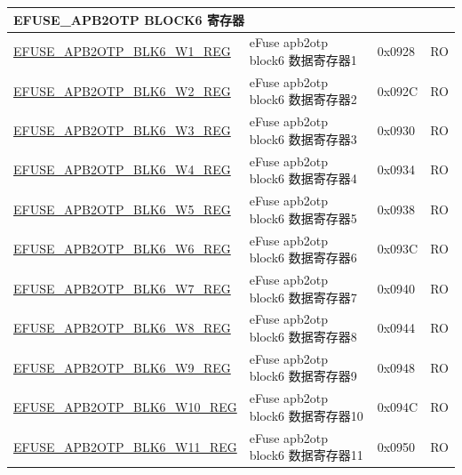 \begin{longtable}{ | p{7cm} | p{6cm} | p{1.2cm} | p{1.5cm} | }
\multicolumn{4}{|l|}{\textbf{EFUSE\_APB2OTP BLOCK6 寄存器}} \\ \hline
\hyperref[regdesc:EFUSEAPB2OTPBLK6WNREG]{EFUSE\_APB2OTP\_BLK6\_W1\_REG} & eFuse apb2otp block6 数据寄存器1 & 0x0928 & RO \\\hline
\hyperref[regdesc:EFUSEAPB2OTPBLK6WNREG]{EFUSE\_APB2OTP\_BLK6\_W2\_REG} & eFuse apb2otp block6 数据寄存器2 & 0x092C & RO \\\hline
\hyperref[regdesc:EFUSEAPB2OTPBLK6WNREG]{EFUSE\_APB2OTP\_BLK6\_W3\_REG} & eFuse apb2otp block6 数据寄存器3 & 0x0930 & RO \\\hline
\hyperref[regdesc:EFUSEAPB2OTPBLK6WNREG]{EFUSE\_APB2OTP\_BLK6\_W4\_REG} & eFuse apb2otp block6 数据寄存器4 & 0x0934 & RO \\\hline
\hyperref[regdesc:EFUSEAPB2OTPBLK6WNREG]{EFUSE\_APB2OTP\_BLK6\_W5\_REG} & eFuse apb2otp block6 数据寄存器5 & 0x0938 & RO \\\hline
\hyperref[regdesc:EFUSEAPB2OTPBLK6WNREG]{EFUSE\_APB2OTP\_BLK6\_W6\_REG} & eFuse apb2otp block6 数据寄存器6 & 0x093C & RO \\\hline
\hyperref[regdesc:EFUSEAPB2OTPBLK6WNREG]{EFUSE\_APB2OTP\_BLK6\_W7\_REG} & eFuse apb2otp block6 数据寄存器7 & 0x0940 & RO \\\hline
\hyperref[regdesc:EFUSEAPB2OTPBLK6WNREG]{EFUSE\_APB2OTP\_BLK6\_W8\_REG} & eFuse apb2otp block6 数据寄存器8 & 0x0944 & RO \\\hline
\hyperref[regdesc:EFUSEAPB2OTPBLK6WNREG]{EFUSE\_APB2OTP\_BLK6\_W9\_REG} & eFuse apb2otp block6 数据寄存器9 & 0x0948 & RO \\\hline
\hyperref[regdesc:EFUSEAPB2OTPBLK6WNREG]{EFUSE\_APB2OTP\_BLK6\_W10\_REG} & eFuse apb2otp block6 数据寄存器10 & 0x094C & RO \\\hline
\hyperref[regdesc:EFUSEAPB2OTPBLK6WNREG]{EFUSE\_APB2OTP\_BLK6\_W11\_REG} & eFuse apb2otp block6 数据寄存器11 & 0x0950 & RO \\\hline


\end{longtable}
